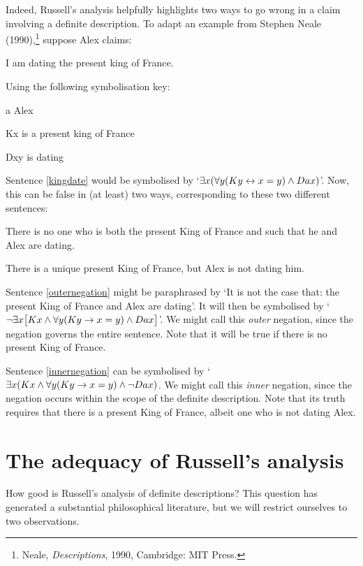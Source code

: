 Indeed, Russell's analysis helpfully highlights two ways to go wrong in a claim involving a definite description. To adapt an example from Stephen Neale (1990),\footnote{Neale, \emph{Descriptions}, 1990, Cambridge: MIT Press.}  suppose Alex claims:
	\begin{earg}
		\item[\ex{kingdate}] I am dating the present king of France.
	\end{earg}
Using the following symbolisation key:
	\begin{ekey}
		\item[a] Alex
		\item[Kx]  is a present king of France
		\item[Dxy]  is dating 
	\end{ekey}
Sentence \ref{kingdate} would be symbolised by `$\exists x (\forall y(Ky \leftrightarrow  x = y) \wedge Dax)$'. Now, this can be false in (at least) two ways, corresponding to these two different sentences:
	\begin{earg}
		\item[\ex{outernegation}] There is no one who is both the present King of France and  such that he and Alex are dating.
		\item[\ex{innernegation}] There is a unique present King of France, but Alex is not dating him.
	\end{earg}
Sentence \ref{outernegation} might be paraphrased by `It is not the case that: the present King of France and Alex are dating'. It will then be symbolised by `$\neg \exists x\bigl[Kx \wedge \forall y(Ky \rightarrow  x = y) \wedge Dax \bigr]$'. We might call this \emph{outer} negation, since the negation governs the entire sentence. Note that it will be true if there is no present King of France.

Sentence \ref{innernegation} can be symbolised by `$\exists x (Kx \wedge \forall y(Ky \rightarrow x = y) \wedge \neg Dax)$. We might call this \emph{inner} negation, since the negation occurs within the scope of the definite description. Note that its truth requires that there is a present King of France, albeit one who is not dating Alex.


\section{The adequacy of Russell's analysis}
How good is Russell's analysis of definite descriptions? This question has generated a substantial philosophical literature, but we will restrict ourselves to two observations.

